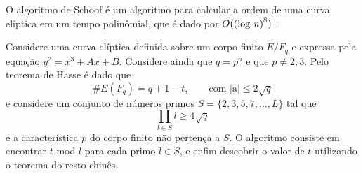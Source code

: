 \begin{apendicesenv}
O algoritmo de Schoof é um algoritmo para calcular a ordem de uma curva elíptica em um tempo polinômial, que é dado por $O(\mbox{(log \textit{n})}^8)$ \cite{Silverman:2009}.

Considere uma curva elíptica definida sobre um corpo finito $E/F_q$ e expressa pela equação $y^2 = x^3 + Ax + B$. Considere ainda que $q = p^n$ e que $p \neq 2,3$. Pelo teorema de Hasse é dado que
$$
\#E(F_q) = q + 1 - t, \qquad \mbox{com |a|} \leq 2 \sqrt{q}
$$
e considere um conjunto de números primos $S = \{2,3,5,7,\dots,L\}$ tal que 
$$
\prod_{l \in S} l \geq 4 \sqrt{q}
$$
e a característica $p$ do corpo finito não pertença a $S$.
O algoritmo consiste em encontrar $t$ mod $l$ para cada primo $l \in S$, e enfim descobrir o valor de $t$ utilizando o teorema do resto chinês.\cite{Alvarado:2005}


\end{apendicesenv}
